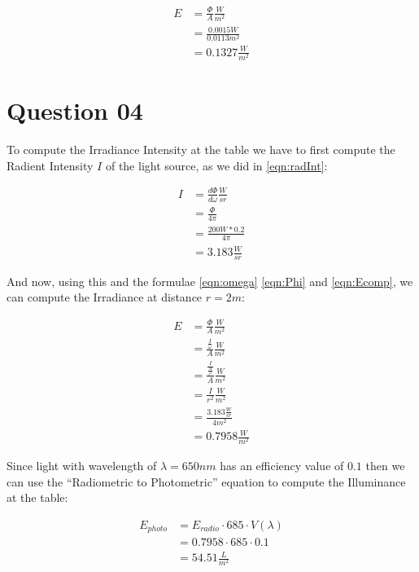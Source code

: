     \begin{align}\label{eqn:Ecomp}
      E &= \frac{\Phi}{A}\frac{W}{m^2} \\
        &= \frac{0.0015W}{0.0113m^2} \\
        &= 0.1327\frac{W}{m^2}
    \end{align}

  \section{Question 04}

    To compute the Irradiance Intensity at the table we have to first compute the Radient Intensity $I$ of the light source, as
    we did in \ref{eqn:radInt}:

    \begin{align}
      I &= \frac{d\Phi}{d\omega}\frac{W}{sr} \\
        &= \frac{\Phi}{4\pi} \\
        &= \frac{200W * 0.2}{4\pi} \\
        &= 3.183 \frac{W}{sr}
    \end{align}

    And now, using this and the formulae \ref{eqn:omega} \ref{eqn:Phi} and \ref{eqn:Ecomp}, we can compute the Irradiance at distance
    $r = 2m$:

    \begin{align}
      E &= \frac{\Phi}{A}\frac{W}{m^2}  \\
        &= \frac{\frac{I}{\omega}}{A}\frac{W}{m^2}  \\
        &= \frac{\frac{I}{\frac{A}{r^2}}}{A}\frac{W}{m^2}  \\
        &= \frac{I}{r^2}\frac{W}{m^2}  \\
        &= \frac{3.183\frac{W}{sr}}{4m^2} \\
        &= 0.7958\frac{W}{m^2}
    \end{align}

    Since light with wavelength of $\lambda = 650nm$ has an efficiency value of $0.1$ then we can use the ``Radiometric to Photometric'' equation
    to compute the Illuminance at the table:

    \begin{align}
      E_{photo} &= E_{radio} \cdot 685 \cdot V(\lambda) \\
                &= 0.7958 \cdot 685 \cdot 0.1 \\
                &= 54.51\frac{L}{m^2}
    \end{align}
